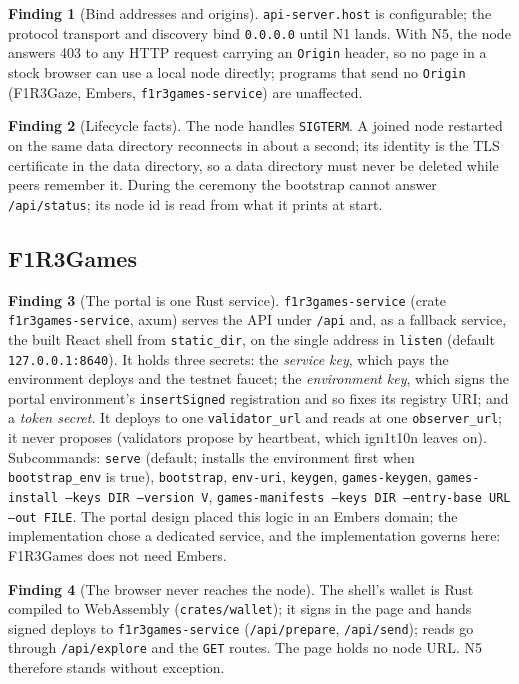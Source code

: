 \documentclass[11pt]{article}
\theoremstyle{definition}
\newtheorem{finding}{Finding}
\theoremstyle{remark}
\newcommand{\code}[1]{\texttt{#1}}
\newcommand{\Gz}{F1R3Gaze}
\newcommand{\Hr}{ign1t10n}
\newcommand{\Gm}{F1R3Games}
\newcommand{\Svc}{\code{f1r3games-service}}
\newcommand{\Em}{Embers}
\begin{document}
\begin{finding}[Bind addresses and origins]\label{f:bind}
\code{api-server.host} is configurable; the protocol transport and discovery bind
\code{0.0.0.0} until N1 lands. With N5, the node answers 403 to any HTTP request
carrying an \code{Origin} header, so no page in a stock browser can use a local node
directly; programs that send no \code{Origin} (\Gz{}, \Em{}, \Svc{}) are unaffected.
\end{finding}

\begin{finding}[Lifecycle facts]\label{f:lifecycle}
The node handles \code{SIGTERM}. A joined node restarted on the same data directory
reconnects in about a second; its identity is the TLS certificate in the data
directory, so a data directory must never be deleted while peers remember it. During
the ceremony the bootstrap cannot answer \code{/api/status}; its node id is read from
what it prints at start.
\end{finding}

\subsection{\Gm{}}

\begin{finding}[The portal is one Rust service]\label{f:svc}
\Svc{} (crate \code{f1r3games-service}, axum) serves the API under \code{/api} and,
as a fallback service, the built React shell from \code{static\_dir}, on the single
address in \code{listen} (default \code{127.0.0.1:8640}). It holds three secrets:
the \emph{service key}, which pays the environment deploys and the testnet faucet;
the \emph{environment key}, which signs the portal environment's
\code{insertSigned} registration and so fixes its registry URI; and a \emph{token
secret}. It deploys to one \code{validator\_url} and reads at one
\code{observer\_url}; it never proposes (validators propose by heartbeat, which
\Hr{} leaves on). Subcommands: \code{serve} (default; installs the environment first
when \code{bootstrap\_env} is true), \code{bootstrap}, \code{env-uri},
\code{keygen}, \code{games-keygen}, \code{games-install --keys DIR --version V},
\code{games-manifests --keys DIR --entry-base URL --out FILE}. The portal design
placed this logic in an \Em{} domain; the implementation chose a dedicated service,
and the implementation governs here: \Gm{} does not need \Em{}.
\end{finding}

\begin{finding}[The browser never reaches the node]\label{f:nonode}
The shell's wallet is Rust compiled to WebAssembly (\code{crates/wallet}); it signs in
the page and hands signed deploys to \Svc{} (\code{/api/prepare}, \code{/api/send});
reads go through \code{/api/explore} and the \code{GET} routes. The page holds no node
URL. N5 therefore stands without exception.
\end{finding}
\end{document}
